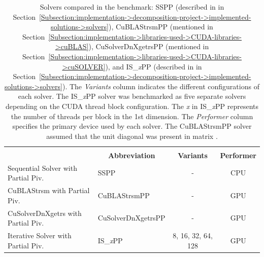 \begin{table}[ht!]
	\centering
	\begin{tabular}{|ll|c|c|}
		\hline
		\rowcolor[HTML]{C0C0C0} 
		\multicolumn{2}{|c|}{\cellcolor[HTML]{C0C0C0}\textbf{Solver}} & \cellcolor[HTML]{C0C0C0} & \multicolumn{1}{c|}{\cellcolor[HTML]{C0C0C0}} \\
		\rowcolor[HTML]{EFEFEF} 
		\multicolumn{1}{|c|}{\cellcolor[HTML]{EFEFEF}\textbf{Name}} & \multicolumn{1}{c|}{\cellcolor[HTML]{EFEFEF}\textbf{Abbreviation}} & \multirow{-2}{*}{\cellcolor[HTML]{C0C0C0}\textbf{Variants}} & \multicolumn{1}{c|}{\multirow{-2}{*}{\cellcolor[HTML]{C0C0C0}\textbf{Performer}}} \\ \hline
		\multicolumn{1}{|l|}{Sequential Solver with Partial Piv.} & SSPP               &         -          & CPU \\
		\multicolumn{1}{|l|}{CuBLAStrsm with Partial Piv.}        & CuBLAStrsmPP       &         -          & GPU \\
		\multicolumn{1}{|l|}{CuSolverDnXgetrs with Partial Piv.}  & CuSolverDnXgetrsPP &         -          & GPU \\
		\multicolumn{1}{|l|}{Iterative Solver with Partial Piv.}  & IS\_\textit{x}PP   & 8, 16, 32, 64, 128 & GPU \\ \hline
	\end{tabular}
	\caption{Solvers compared in the benchmark: SSPP (described in  in Section~\ref{Subsection:implementation->decomposition-project->implemented-solutions->solvers}), CuBLAStrsmPP (mentioned in Section~\ref{Subsection:implementation->libraries-used->CUDA-libraries->cuBLAS}), CuSolverDnXgetrsPP (mentioned in Section~\ref{Subsection:implementation->libraries-used->CUDA-libraries->cuSOLVER}), and IS\_\textit{x}PP (described in  in Section~\ref{Subsection:implementation->decomposition-project->implemented-solutions->solvers}). The \textit{Variants} column indicates the different configurations of each solver. The IS\_\textit{x}PP solver was benchmarked as five separate solvers depending on the CUDA thread block configuration. The \textit{x} in IS\_\textit{x}PP represents the number of threads per block in the 1st dimension. The \textit{Performer} column specifies the primary device used by each solver. The CuBLAStrsmPP solver assumed that the unit diagonal was present in matrix .}
	\label{Table:comparing-decomposers-and-solvers->decomposition-project-benchmarks->solvers-benchmark->table-of-solvers}
\end{table}

